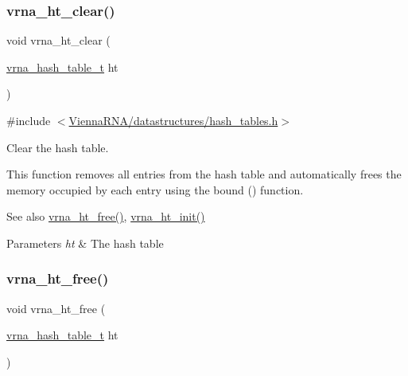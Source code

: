 \subsubsection{\texorpdfstring{vrna\+\_\+ht\+\_\+clear()}{vrna\_ht\_clear()}}
{\footnotesize\ttfamily void vrna\+\_\+ht\+\_\+clear (\begin{DoxyParamCaption}\item[{\hyperlink{group__hash__table__utils_gabc7c6f41b718c8e23929e528891a89c4}{vrna\+\_\+hash\+\_\+table\+\_\+t}}]{ht }\end{DoxyParamCaption})}



{\ttfamily \#include $<$\hyperlink{hash__tables_8h}{Vienna\+R\+N\+A/datastructures/hash\+\_\+tables.\+h}$>$}



Clear the hash table. 

This function removes all entries from the hash table and automatically free\textquotesingle{}s the memory occupied by each entry using the bound () function.

\begin{DoxySeeAlso}{See also}
\hyperlink{group__hash__table__utils_ga479db024c70437aa2576d60b373c5262}{vrna\+\_\+ht\+\_\+free()}, \hyperlink{group__hash__table__utils_ga37d1c7e13087a2b7c1b87fda34577c29}{vrna\+\_\+ht\+\_\+init()}
\end{DoxySeeAlso}

\begin{DoxyParams}{Parameters}
{\em ht} & The hash table \\
\hline
\end{DoxyParams}
\mbox{\label{group__hash__table__utils_ga479db024c70437aa2576d60b373c5262}} 
\subsubsection{\texorpdfstring{vrna\+\_\+ht\+\_\+free()}{vrna\_ht\_free()}}
{\footnotesize\ttfamily void vrna\+\_\+ht\+\_\+free (\begin{DoxyParamCaption}\item[{\hyperlink{group__hash__table__utils_gabc7c6f41b718c8e23929e528891a89c4}{vrna\+\_\+hash\+\_\+table\+\_\+t}}]{ht }\end{DoxyParamCaption})}



